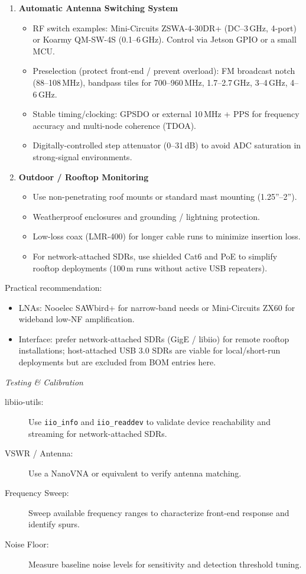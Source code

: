 \documentclass[11pt]{report}
\newcommand{\gc}[1]{\textcolor[rgb]{1.00,0.00,0.00}{#1}} %
\begin{document}
\begin{description}
\begin{enumerate}[label=\roman*)]
    \item \textbf{Automatic Antenna Switching System}
    \begin{itemize}
        \item RF switch examples: Mini-Circuits ZSWA-4-30DR+ (DC--3\,GHz, 4-port) or Koarmy QM-SW-4S (0.1--6\,GHz). Control via Jetson GPIO or a small MCU.
        \item Preselection (protect front-end / prevent overload): FM broadcast notch (88--108\,MHz), bandpass tiles for 700--960\,MHz, 1.7--2.7\,GHz, 3--4\,GHz, 4--6\,GHz.
        \item Stable timing/clocking: GPSDO or external 10\,MHz + PPS for frequency accuracy and multi-node coherence (TDOA).
        \item Digitally-controlled step attenuator (0--31\,dB) to avoid ADC saturation in strong-signal environments.
    \end{itemize}
    
    \item \textbf{Outdoor / Rooftop Monitoring}
    \begin{itemize}
        \item Use non-penetrating roof mounts or standard mast mounting (1.25''--2'').
        \item Weatherproof enclosures and grounding / lightning protection.
        \item Low-loss coax (LMR-400) for longer cable runs to minimize insertion loss.
        \item For network-attached SDRs, use shielded Cat6 and PoE to simplify rooftop deployments (100\,m runs without active USB repeaters).
    \end{itemize}
\end{enumerate}

\gc{Practical recommendation:}
\begin{itemize}
    \item LNAs: Nooelec SAWbird+ for narrow-band needs or Mini-Circuits ZX60 for wideband low-NF amplification.
    \item Interface: prefer network-attached SDRs (GigE / libiio) for remote rooftop installations; host-attached USB 3.0 SDRs are viable for local/short-run deployments but are excluded from BOM entries here.
\end{itemize}

\textit{Testing \& Calibration}

\begin{description}
    \item[libiio-utils:] Use \texttt{iio\_info} and \texttt{iio\_readdev} to validate device reachability and streaming for network-attached SDRs.
    \item[VSWR / Antenna:] Use a NanoVNA or equivalent to verify antenna matching.
    \item[Frequency Sweep:] Sweep available frequency ranges to characterize front-end response and identify spurs.
    \item[Noise Floor:] Measure baseline noise levels for sensitivity and detection threshold tuning.
\end{description}


\end{description}
\end{document}
